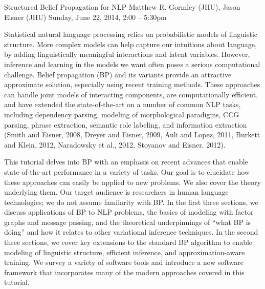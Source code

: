 \begin{tutorial}{Structured Belief Propagation for NLP}
  {Matthew R. Gormley (JHU), Jason Eisner (JHU)}
  {Sunday, June 22, 2014, 2:00 -- 5:30pm}
  {\TutLocF}

Statistical natural language processing relies on probabilistic models of linguistic structure. More complex models can help capture our intuitions about language, by adding linguistically meaningful interactions and latent variables. However, inference and learning in the models we want often poses a serious computational challenge. Belief propagation (BP) and its variants provide an attractive approximate solution, especially using recent training methods. These approaches can handle joint models of interacting components, are computationally efficient, and have extended the state-of-the-art on a number of common NLP tasks, including dependency parsing, modeling of morphological paradigms, CCG parsing, phrase extraction, semantic role labeling, and information extraction (Smith and Eisner, 2008, Dreyer and Eisner, 2009, Auli and Lopez, 2011, Burkett and Klein, 2012, Naradowsky et al., 2012, Stoyanov and Eisner, 2012).

This tutorial delves into BP with an emphasis on recent advances that enable state-of-the-art performance in a variety of tasks. Our goal is to elucidate how these approaches can easily be applied to new problems. We also cover the theory underlying them. Our target audience is researchers in human language technologies; we do not assume familarity with BP. In the first three sections, we discuss applications of BP to NLP problems, the basics of modeling with factor graphs and message passing, and the theoretical underpinnings of “what BP is doing” and how it relates to other variational inference techniques. In the second three sections, we cover key extensions to the standard BP algorithm to enable modeling of linguistic structure, efficient inference, and approximation-aware training. We survey a variety of software tools and introduce a new software framework that incorporates many of the modern approaches covered in this tutorial.

\end{tutorial} 
